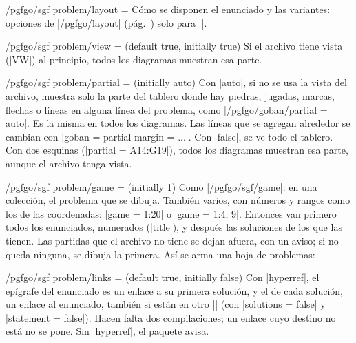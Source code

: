 \begin{key}{/pgfgo/sgf problem/layout = }
	Cómo se disponen el enunciado y las variantes: opciones de |/pgfgo/layout| (pág.~\pageref{subsec:disposicion}) solo para |\sgfproblem|.
\end{key}

\begin{key}{/pgfgo/sgf problem/view =  (default true, initially true)}
	Si el archivo tiene vista (|VW|) al principio, todos los diagramas muestran esa parte.
\end{key}

\begin{key}{/pgfgo/sgf problem/partial =  (initially auto)}
	Con |auto|, si no se usa la vista del archivo, muestra solo la parte del tablero donde hay piedras, jugadas, marcas, flechas o líneas en alguna línea del problema, como |/pgfgo/goban/partial = auto|. Es la misma en todos los diagramas. Las líneas que se agregan alrededor se cambian con |goban = {partial margin = ...}|. Con |false|, se ve todo el tablero. Con dos esquinas (|partial = A14:G19|), todos los diagramas muestran esa parte, aunque el archivo tenga vista.

	\begin{codeexample}
	\end{codeexample}

\end{key}

\begin{key}{/pgfgo/sgf problem/game =  (initially 1)}
	Como |/pgfgo/sgf/game|: en una colección, el problema que se dibuja. También varios, con números y rangos como los de las coordenadas: |game = 1:20| o |game = {1:4, 9}|. Entonces van primero todos los enunciados, numerados (|title|), y después las soluciones de los que las tienen. Las partidas que el archivo no tiene se dejan afuera, con un aviso; si no queda ninguna, se dibuja la primera. Así se arma una hoja de problemas:

	\begin{codeexample}
	\end{codeexample}
\end{key}

\begin{key}{/pgfgo/sgf problem/links =  (default true, initially false)}
	Con |hyperref|, el epígrafe del enunciado es un enlace a su primera solución, y el de cada solución, un enlace al enunciado, también si están en otro |\sgfproblem| (con |solutions = false| y |statement = false|). Hacen falta dos compilaciones; un enlace cuyo destino no está no se pone. Sin |hyperref|, el paquete avisa.

	\begin{codeexample}[]
	\end{codeexample}
\end{key}

